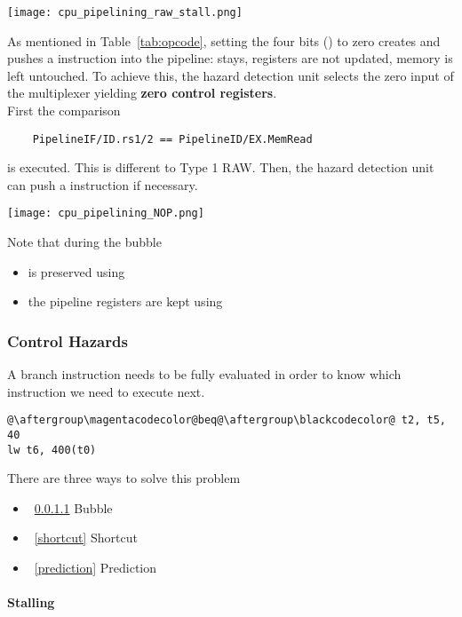 \texttt{[image: cpu\_pipelining\_raw\_stall.png]}

\newpar{}
As mentioned in Table~\ref{tab:opcode}, setting the four bits () to zero creates and pushes a  instruction into the pipeline:  stays, registers are not updated, memory is left untouched. To achieve this, the hazard detection unit selects the zero input of the multiplexer yielding \textbf{zero control registers}.\\
First the comparison
\begin{lstlisting}
    PipelineIF/ID.rs1/2 == PipelineID/EX.MemRead
\end{lstlisting}
is executed. This is different to Type 1 RAW. Then, the hazard detection unit can push a  instruction if necessary.
\begin{center}
    \texttt{[image: cpu\_pipelining\_NOP.png]}
\end{center}
Note that during the bubble
\begin{itemize}
    \item {} is preserved using 
    \item the pipeline registers are kept using 
\end{itemize}

\subsubsection{Control Hazards}\label{control hazards}

A branch instruction needs to be fully evaluated in order to know which instruction we need to execute next.

\begin{lstlisting}[escapechar=@]
@\aftergroup\magentacodecolor@beq@\aftergroup\blackcodecolor@ t2, t5, 40
lw t6, 400(t0)
\end{lstlisting}

There are three ways to solve this problem
\begin{itemize}
    \item~\ref{contr_stalling} Bubble
    \item~\ref{shortcut} Shortcut
    \item~\ref{prediction} Prediction
\end{itemize}

\paragraph{Stalling}\label{contr_stalling}

